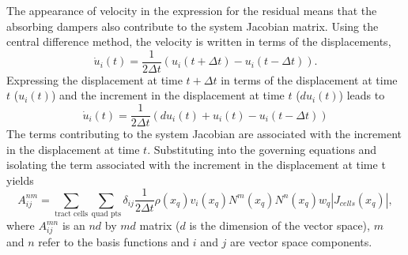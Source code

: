 The appearance of velocity in the expression for the residual means
that the absorbing dampers also contribute to the system Jacobian
matrix. Using the central difference method, the velocity is written
in terms of the displacements,
\begin{equation}
\dot{u}_{i}(t)=\frac{1}{2\Delta t}(u_{i}(t+\Delta t)-u_{i}(t-\Delta t)).
\end{equation}
Expressing the displacement at time $t+\Delta t$ in terms of the
displacement at time $t$ ($u_{i}(t)$) and the increment in the displacement
at time $t$ ($du_{i}(t)$) leads to
\begin{equation}
\dot{u}_{i}(t)=\frac{1}{2\Delta t}(du_{i}(t)+u_{i}(t)-u_{i}(t-\Delta t))
\end{equation}
The terms contributing to the system Jacobian are associated with
the increment in the displacement at time $t$. Substituting into
the governing equations and isolating the term associated with the
increment in the displacement at time t yields
\begin{equation}
A_{ij}^{nm}=\sum_{\text{tract cells}}\sum_{\text{quad pts}}\delta_{ij}\frac{1}{2\Delta t}\rho(x_{q})v_{i}(x_{q})N^{m}(x_{q})N^{n}(x_{q})w_{q}|J_{cells}(x_{q})|,
\end{equation}
where $A_{ij}^{mn}$ is an $nd$ by $md$ matrix ($d$ is the dimension
of the vector space), $m$ and $n$ refer to the basis functions and
$i$ and $j$ are vector space components.



